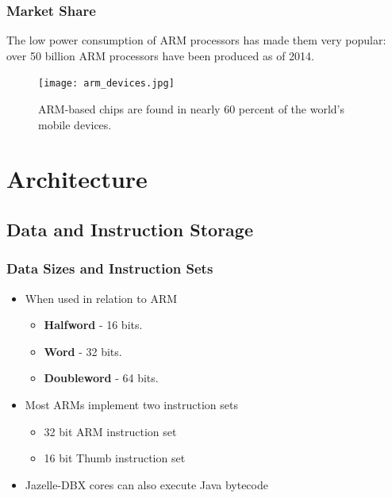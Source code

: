 \documentclass{beamer}
\begin{document}

\begin{frame}
\frametitle{Market Share}
The low power consumption of ARM processors has made them very popular: over 50 billion ARM processors have been produced as of 2014.
\begin{figure}
\texttt{[image: arm\_devices.jpg]}
\caption{ARM-based chips are found in nearly 60 percent of the world’s mobile devices.}
\end{figure}
\end{frame}

\section{Architecture}
\subsection{Data and Instruction Storage}
\begin{frame}
\frametitle{Data Sizes and Instruction Sets}
\begin{itemize}
\item When used in relation to ARM
  \begin{itemize}
  \item \textbf{Halfword} - 16 bits.
  \item \textbf{Word} - 32 bits.
  \item \textbf{Doubleword} - 64 bits.
  \end{itemize}
\item Most ARMs implement two instruction sets
  \begin{itemize}
  \item 32 bit ARM instruction set
  \item 16 bit Thumb instruction set
  \end{itemize}
\item Jazelle-DBX cores can also execute Java bytecode
\end{itemize}
\end{frame}

\end{document}
